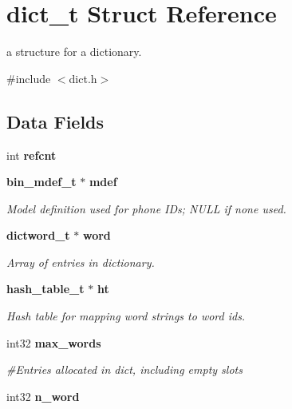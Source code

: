\section{dict\-\_\-t Struct Reference}
\label{structdict__t}


a structure for a dictionary.  




{\ttfamily \#include $<$dict.\-h$>$}

\subsection*{Data Fields}
\begin{DoxyCompactItemize}
\item 
int {\bfseries refcnt}\label{structdict__t_a5fab69be1205a6c84ec93a4b08924d3c}

\item 
{\bf bin\-\_\-mdef\-\_\-t} $\ast$ {\bf mdef}\label{structdict__t_a3a01eb5a3ebda5652d434be26e0cfdd2}

\begin{DoxyCompactList}\small\item\em Model definition used for phone I\-Ds; N\-U\-L\-L if none used. \end{DoxyCompactList}\item 
{\bf dictword\-\_\-t} $\ast$ {\bf word}\label{structdict__t_a9e6636bbe45936a03381fea430addd31}

\begin{DoxyCompactList}\small\item\em Array of entries in dictionary. \end{DoxyCompactList}\item 
{\bf hash\-\_\-table\-\_\-t} $\ast$ {\bf ht}\label{structdict__t_a7205aae4fbeef3aaa53f94b6af529af2}

\begin{DoxyCompactList}\small\item\em Hash table for mapping word strings to word ids. \end{DoxyCompactList}\item 
int32 {\bf max\-\_\-words}\label{structdict__t_af6142600cef73f846b58ba9bc36b02ac}

\begin{DoxyCompactList}\small\item\em \#\-Entries allocated in dict, including empty slots \end{DoxyCompactList}\item 
int32 {\bf n\-\_\-word}\label{structdict__t_af00f60319a7025361e291af5addb6b31}


\end{DoxyCompactItemize}
